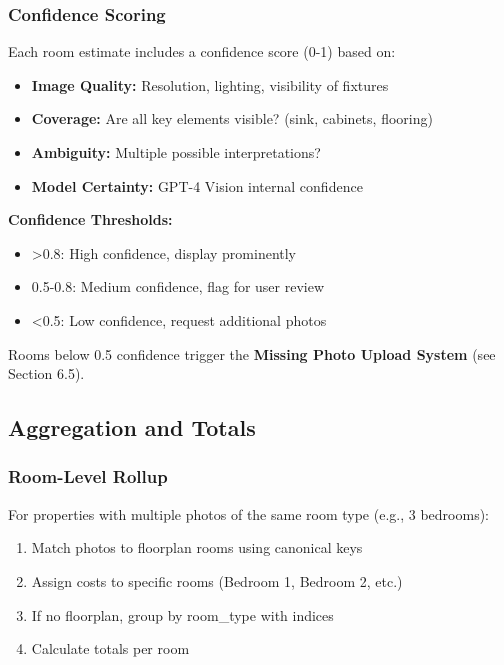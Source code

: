 \documentclass[11pt,a4paper]{article}
\begin{document}
\subsubsection{Confidence Scoring}

Each room estimate includes a confidence score (0-1) based on:

\begin{itemize}
  \item \textbf{Image Quality:} Resolution, lighting, visibility of fixtures
  \item \textbf{Coverage:} Are all key elements visible? (sink, cabinets, flooring)
  \item \textbf{Ambiguity:} Multiple possible interpretations?
  \item \textbf{Model Certainty:} GPT-4 Vision internal confidence
\end{itemize}

\textbf{Confidence Thresholds:}
\begin{itemize}
  \item \textgreater 0.8: High confidence, display prominently
  \item 0.5-0.8: Medium confidence, flag for user review
  \item \textless 0.5: Low confidence, request additional photos
\end{itemize}

Rooms below 0.5 confidence trigger the \textbf{Missing Photo Upload System} (see Section 6.5).

\subsection{Aggregation and Totals}

\subsubsection{Room-Level Rollup}

For properties with multiple photos of the same room type (e.g., 3 bedrooms):

\begin{enumerate}
  \item Match photos to floorplan rooms using canonical keys
  \item Assign costs to specific rooms (Bedroom 1, Bedroom 2, etc.)
  \item If no floorplan, group by room\_type with indices
  \item Calculate totals per room
\end{enumerate}
\end{document}
